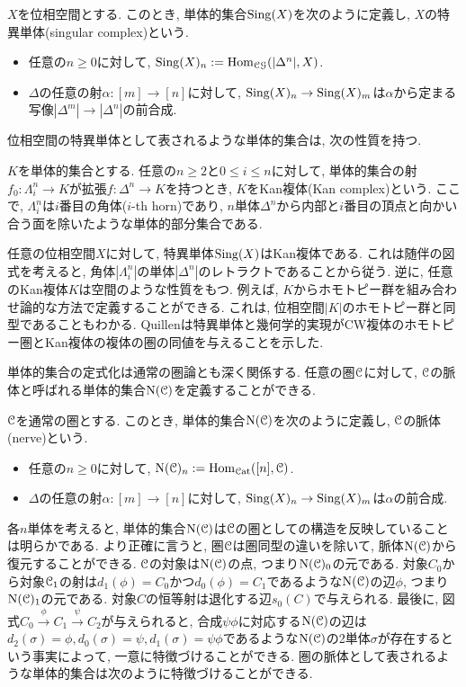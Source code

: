 \documentclass[uplatex, a4paper, 14Q, dvipdfmx]{jsreport}
\begin{document}
$X$を位相空間とする.
このとき, 単体的集合$\mathrm{Sing}(X)$を次のように定義し, $X$の特異単体(singular complex)という.
\begin{itemize}
  \item 任意の$n \geq 0$に対して, $\mathrm{Sing}(X)_n := \mathrm{Hom}_{\mathcal{CG}}(|\Delta^n|,X)$.
  \item $\Delta$の任意の射$\alpha : [m] \to [n]$に対して, $\mathrm{Sing}(X)_n \to \mathrm{Sing}(X)_m$は$\alpha$から定まる写像$|\Delta^m| \to |\Delta^n|$の前合成. 
\end{itemize} 

位相空間の特異単体として表されるような単体的集合は, 次の性質を持つ. 

\begin{definition}[Kan複体] \label{def.1.1.2.1}
  $K$を単体的集合とする. 
  任意の$n \geq 2$と$0 \leq i \leq n$に対して, 単体的集合の射$f_0 : \Lambda^n_i \to K$が拡張$f : \Delta^n \to K$を持つとき, $K$をKan複体(Kan complex)という.
  ここで, $\Lambda^n_i$は$i$番目の角体($i$-th horn)であり, $n$単体$\Delta^n$から内部と$i$番目の頂点と向かい合う面を除いたような単体的部分集合である. 
\end{definition}

任意の位相空間$X$に対して, 特異単体$\mathrm{Sing}(X)$はKan複体である. 
これは随伴の図式を考えると, 角体$|\Lambda^n_i|$の単体$|\Delta^n|$のレトラクトであることから従う.
逆に, 任意のKan複体$K$は空間のような性質をもつ. 
例えば, $K$からホモトピー群を組み合わせ論的な方法で定義することができる. 
これは, 位相空間$|K|$のホモトピー群と同型であることもわかる.
Quillenは特異単体と幾何学的実現がCW複体のホモトピー圏とKan複体の複体の圏の同値を与えることを示した.

単体的集合の定式化は通常の圏論とも深く関係する. 
任意の圏$\mathcal{C}$に対して, $\mathcal{C}$の脈体と呼ばれる単体的集合$\mathrm{N}(\mathcal{C})$を定義することができる. 

$\mathcal{C}$を通常の圏とする. 
このとき, 単体的集合$\mathrm{N}(\mathcal{C})$を次のように定義し, $\mathcal{C}$の脈体(nerve)という.
\begin{itemize}
  \item 任意の$n \geq 0$に対して, $\mathrm{N}(\mathcal{C})_n := \mathrm{Hom}_{\mathcal{C}\mathrm{at}}([n],\mathcal{C})$.
  \item $\Delta$の任意の射$\alpha : [m] \to [n]$に対して, $\mathrm{Sing}(X)_n \to \mathrm{Sing}(X)_m$は$\alpha$の前合成. 
\end{itemize}

各$n$単体を考えると, 単体的集合$\mathrm{N}(\mathcal{C})$は$\mathcal{C}$の圏としての構造を反映していることは明らかである. 
より正確に言うと, 圏$\mathcal{C}$は圏同型の違いを除いて, 脈体$\mathrm{N}(\mathcal{C})$から復元することができる. 
$\mathcal{C}$の対象は$\mathrm{N}(\mathcal{C})$の点, つまり$\mathrm{N}(\mathcal{C})_0$の元である. 
対象$C_0$から対象$\mathcal{C}_1$の射は$d_1(\phi)=C_0$かつ$d_0(\phi)=C_1$であるような$\mathrm{N}(\mathcal{C})$の辺$\phi$, つまり$\mathrm{N}(\mathcal{C})_1$の元である. 
対象$C$の恒等射は退化する辺$s_0(C)$で与えられる.
最後に, 図式$C_0 \xrightarrow{\phi} C_1 \xrightarrow{\psi} C_2$が与えられると, 合成$\psi\phi$に対応する$\mathrm{N}(\mathcal{C})$の辺は$d_2(\sigma)=\phi,d_0(\sigma)=\psi,d_1(\sigma)=\psi\phi$であるような$\mathrm{N}(\mathcal{C})$の2単体$\sigma$が存在するという事実によって, 一意に特徴づけることができる.
圏の脈体として表されるような単体的集合は次のように特徴づけることができる. 
\end{document}
